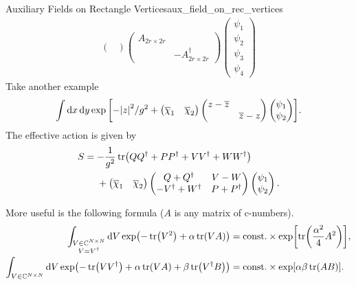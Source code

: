 \documentclass{article}
\begin{document}
\begin{example}{Auxiliary Fields on Rectangle Vertices}{aux_field_on_rec_vertices}
\begin{align*}
\begin{pmatrix}
        \end{pmatrix} \begin{pmatrix}
            A_{2r\times 2r} & \\
            & -A^\dagger_{2r\times 2r}
        \end{pmatrix} \begin{pmatrix}
            \psi_1 \\ \psi_2 \\ \psi_3 \\ \psi_4
        \end{pmatrix}
    \end{align*}
    Take another example
    \[ \int \dd{x} \dd{y} \exp\qty[-\abs{z}^2/g^2 + \begin{pmatrix}
        \overline{\chi}_1 & \overline{\chi}_2
    \end{pmatrix} \begin{pmatrix}
        z - \overline{z} & \\
        & \overline{z} - z
    \end{pmatrix} \begin{pmatrix}
        \psi_1 \\ \psi_2
    \end{pmatrix}]. \]
    The effective action is given by
    \begin{align*}
        S &= -\frac{1}{g^2} \tr(QQ^\dagger + PP^\dagger + VV^\dagger + WW^\dagger) \\
        &\phantom{{}={}} + \begin{pmatrix}
            \overline{\chi}_1 & \overline{\chi}_2
        \end{pmatrix} \begin{pmatrix}
            Q + Q^\dagger & V - W \\
            -V^\dagger + W^\dagger & P + P^\dagger
        \end{pmatrix} \begin{pmatrix}
            \psi_1 \\ \psi_2
        \end{pmatrix}.
    \end{align*}
\end{example}

More useful is the following formula ($A$ is any matrix of c-numbers).
\begin{align*}
    \int_{\substack{V\in \mathbb{C}^{N\times N} \\ V=V^\dagger}} \dd{V} \exp(-\tr(V^2) + \alpha\tr(VA)) &= \mathrm{const.} \times \exp[\tr(\frac{\alpha^2}{4}A^2)], \\
    \int_{V\in \mathbb{C}^{N\times N}} \dd{V} \exp(-\tr(VV^\dagger) + \alpha\tr(VA) + \beta \tr(V^\dagger B)) &= \mathrm{const.} \times \exp[\alpha\beta \tr(AB)].
\end{align*}
\end{document}
